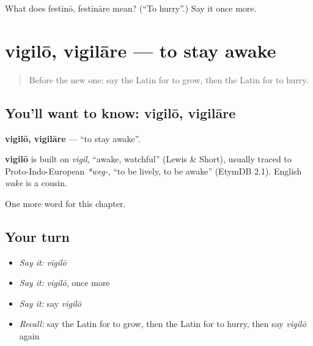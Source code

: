 \begin{tcolorbox}[breakable,colback=teal!4,colframe=teal!35!black,title={Before you move on}]
What does festīnō, festīnāre mean? (\textquotedblleft{}To hurry\textquotedblright{}.) Say it once more.
\end{tcolorbox}
\section[vigilō, vigilāre]{vigilō, vigilāre — to stay awake}

\label{lesson:LA-C158-vigilo}



\begin{quote}
Before the new one: say the Latin for to grow, then the Latin for to hurry.
\end{quote}

\subsection*{You'll want to know: vigilō, vigilāre}
\textbf{vigilō, vigilāre} — \textquotedblleft{}to stay awake\textquotedblright{}.

\begin{cousinweb}
\textbf{vigilō} is built on \emph{vigil}, \textquotedblleft{}awake, watchful\textquotedblright{} (Lewis \& Short), usually traced to Proto-Indo-European \emph{*weg-}, \textquotedblleft{}to be lively, to be awake\textquotedblright{} (EtymDB 2.1). English \emph{wake} is a cousin.
\end{cousinweb}

\begin{grammarlens}[title={What you've built}]
One more word for this chapter.
\end{grammarlens}

\subsection*{Your turn}
\begin{itemize}
\raggedright
  \item \emph{Say it:} \emph{vigilō}
  \item \emph{Say it:} \emph{vigilō}, once more
  \item \emph{Say it:} say \emph{vigilō}
  \item \emph{Recall:} say the Latin for to grow, then the Latin for to hurry, then say \emph{vigilō} again
\end{itemize}

